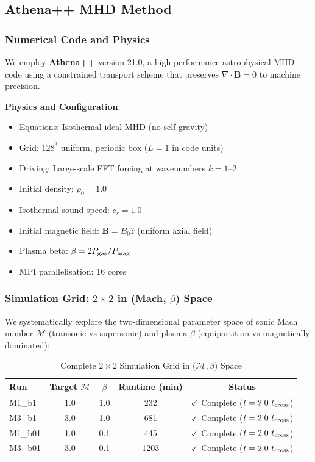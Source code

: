 \documentclass[11pt,a4paper]{article}
\begin{document}
\subsection{Athena++ MHD Method}

\subsubsection{Numerical Code and Physics}

We employ \textbf{Athena++} version 21.0, a high-performance astrophysical MHD code using a constrained transport scheme that preserves $\nabla \cdot \mathbf{B} = 0$ to machine precision.

\textbf{Physics and Configuration}:
\begin{itemize}
    \item Equations: Isothermal ideal MHD (no self-gravity)
    \item Grid: $128^3$ uniform, periodic box ($L = 1$ in code units)
    \item Driving: Large-scale FFT forcing at wavenumbers $k = 1$--$2$
    \item Initial density: $\rho_0 = 1.0$
    \item Isothermal sound speed: $c_s = 1.0$
    \item Initial magnetic field: $\mathbf{B} = B_0 \hat{z}$ (uniform axial field)
    \item Plasma beta: $\beta = 2P_{\rm gas}/P_{\rm mag}$
    \item MPI parallelisation: 16 cores
\end{itemize}

\subsubsection{Simulation Grid: $2\times2$ in (Mach, $\beta$) Space}

We systematically explore the two-dimensional parameter space of sonic Mach number $\mathcal{M}$ (transonic vs supersonic) and plasma $\beta$ (equipartition vs magnetically dominated):

\begin{table}[H]
\centering
\caption{Complete $2\times2$ Simulation Grid in ($\mathcal{M}, \beta$) Space}
\begin{tabular}{lcccc}
\toprule
Run & Target $\mathcal{M}$ & $\beta$ & Runtime (min) & Status \\
\midrule
M1\_b1  & 1.0 & 1.0 & 232  & $\checkmark$ Complete ($t = 2.0~t_{\rm cross}$) \\
M3\_b1  & 3.0 & 1.0 & 681  & $\checkmark$ Complete ($t = 2.0~t_{\rm cross}$) \\
M1\_b01 & 1.0 & 0.1 & 445  & $\checkmark$ Complete ($t = 2.0~t_{\rm cross}$) \\
M3\_b01 & 3.0 & 0.1 & 1203 & $\checkmark$ Complete ($t = 2.0~t_{\rm cross}$) \\
\bottomrule
\end{tabular}
\end{table}
\end{document}
